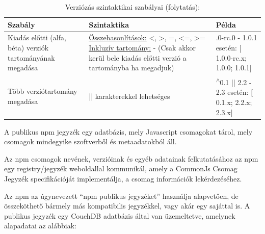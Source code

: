 	\begin{table}[h]
		\caption{Verziózás szintaktikai szabályai (folytatás):}
		\label{tab:sem-ver-pt2}
		\begin{tabularx}{\textwidth} { 
				| >{\centering\arraybackslash}X 
				| >{\centering\arraybackslash}X 
				| >{\centering\arraybackslash}X | }
			\hline
			\textbf{Szabály} & \textbf{Szintaktika} & \textbf{Példa} \\
			\hline 
			Kiadás előtti (alfa, béta) verziók tartományának megadása & \underline{Összehasonlítások:} <, >, =, <=, >= \underline{Inkluzív tartomány:} - (Csak akkor kerül bele kiadás előtti verzió a tartományba ha megadjuk) & 1.0.0-rc.0 - 1.0.1 esetén: $\big[$1.0.0-rc.x; 1.0.0; 1.0.1$\big]$ \\
			\hline
			Több verziótartomány megadása & || karakterekkel lehetséges & \textsuperscript{$\wedge$}0.1 ||  2.2 - 2.3 esetén: $\big[$0.1.x; 2.2.x; 2.3.x$\big]$\\
			\hline
		\end{tabularx}
	\end{table}
	\begin{flushright}
		\cite{npm-versioning} \cite{npm-versioning-semver}
	\end{flushright}


A publikus npm jegyzék egy adatbázis, mely Javascript csomagokat tárol, mely csomagok mindegyike szoftverből és metaadatokból áll.

Az npm csomagok nevének, verzióinak és egyéb adatainak felkutatásához az npm egy registry/jegyzék weboldallal kommunikál, amely a CommonJs Csomag Jegyzék specifikációját implementálja, a csomag információk lekérdezéséhez.
 
Az npm az úgynevezett “npm publikus jegyzéket” használja alapvetően, de összeköthető bármely más kompatibilis jegyzékkel, vagy akár egy sajáttal is. A publikus jegyzék egy CouchDB adatbázis által van üzemeltetve, amelynek alapadatai az alábbiak:\\

